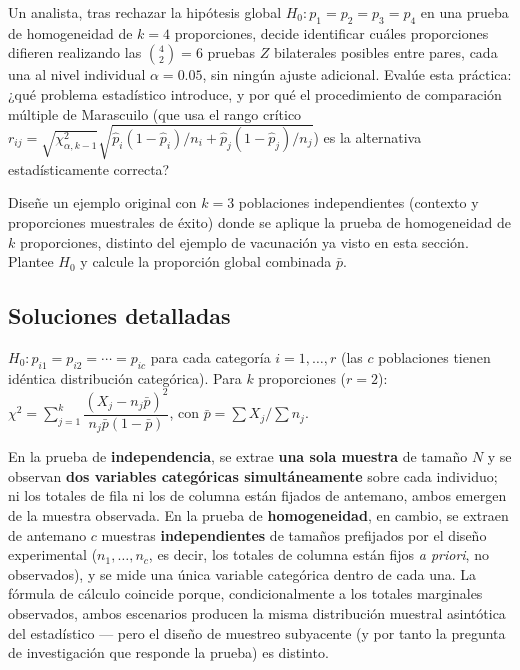 \begin{problema}
	\label{prob:cb7e8b6}
	Un analista, tras rechazar la hipótesis global $H_0:p_1=p_2=p_3=p_4$ en una prueba de homogeneidad de $k=4$ proporciones, decide identificar cuáles proporciones difieren realizando las $\binom{4}{2}=6$ pruebas $Z$ bilaterales posibles entre pares, cada una al nivel individual $\alpha=0.05$, sin ningún ajuste adicional. Evalúe esta práctica: ¿qué problema estadístico introduce, y por qué el procedimiento de comparación múltiple de Marascuilo (que usa el rango crítico $r_{ij}=\sqrt{\chi^2_{\alpha,k-1}}\sqrt{\hat p_i(1-\hat p_i)/n_i+\hat p_j(1-\hat p_j)/n_j}$) es la alternativa estadísticamente correcta?
\end{problema}

\begin{problema}
	\label{prob:4eeb5bb}
	Diseñe un ejemplo original con $k=3$ poblaciones independientes (contexto y proporciones muestrales de éxito) donde se aplique la prueba de homogeneidad de $k$ proporciones, distinto del ejemplo de vacunación ya visto en esta sección. Plantee $H_0$ y calcule la proporción global combinada $\bar p$.
\end{problema}

\subsection*{Soluciones detalladas}

\begin{solproblema}
	$H_0: p_{i1}=p_{i2}=\cdots=p_{ic}$ para cada categoría $i=1,\ldots,r$ (las $c$ poblaciones tienen idéntica distribución categórica). Para $k$ proporciones ($r=2$): $\chi^2 = \sum_{j=1}^k \dfrac{(X_j-n_j\bar p)^2}{n_j\bar p(1-\bar p)}$, con $\bar p=\sum X_j/\sum n_j$.
\end{solproblema}

\begin{solproblema}[prob:44ef899]
	En la prueba de \textbf{independencia}, se extrae \textbf{una sola muestra} de tamaño $N$ y se observan \textbf{dos variables categóricas simultáneamente} sobre cada individuo; ni los totales de fila ni los de columna están fijados de antemano, ambos emergen de la muestra observada. En la prueba de \textbf{homogeneidad}, en cambio, se extraen de antemano $c$ muestras \textbf{independientes} de tamaños prefijados por el diseño experimental ($n_1,\ldots,n_c$, es decir, los totales de columna están fijos \emph{a priori}, no observados), y se mide una única variable categórica dentro de cada una. La fórmula de cálculo coincide porque, condicionalmente a los totales marginales observados, ambos escenarios producen la misma distribución muestral asintótica del estadístico — pero el diseño de muestreo subyacente (y por tanto la pregunta de investigación que responde la prueba) es distinto.
\end{solproblema}

